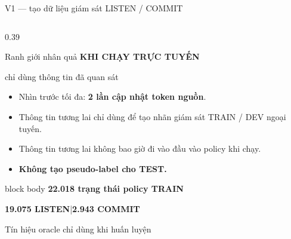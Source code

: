 \documentclass[aspectratio=169,11pt]{beamer}
\begin{document}
\begin{frame}{V1 --- tạo dữ liệu giám sát LISTEN / COMMIT}
\begin{columns}[T,onlytextwidth]
\begin{column}{0.39\textwidth}
\begin{alertblock}{Ranh giới nhân quả}
        \vspace{0.55em}
        \textbf{KHI CHẠY TRỰC TUYẾN}\par
        chỉ dùng thông tin đã quan sát
      \end{alertblock}
      \scriptsize
      \begin{itemize}
        \setlength\itemsep{0.25em}
        \item Nhìn trước tối đa: \textbf{2 lần cập nhật token nguồn}.
        \item Thông tin tương lai chỉ dùng để tạo nhãn giám sát TRAIN / DEV ngoại tuyến.
        \item Thông tin tương lai không bao giờ đi vào đầu vào policy khi chạy.
        \item \textbf{Không tạo pseudo-label cho TEST.}
      \end{itemize}
      \vspace{0.15em}
      \begin{beamercolorbox}[rounded=true,sep=0.45em,center]{block body}
        \textbf{22.018 trạng thái policy TRAIN}\par
        \vspace{0.15em}
        \textbf{19.075 LISTEN}\quad |\quad \textbf{2.943 COMMIT}\par
        \vspace{0.2em}
        \scriptsize Tín hiệu oracle chỉ dùng khi huấn luyện
      \end{beamercolorbox}
    \end{column}
  \end{columns}
\end{frame}
\end{document}
